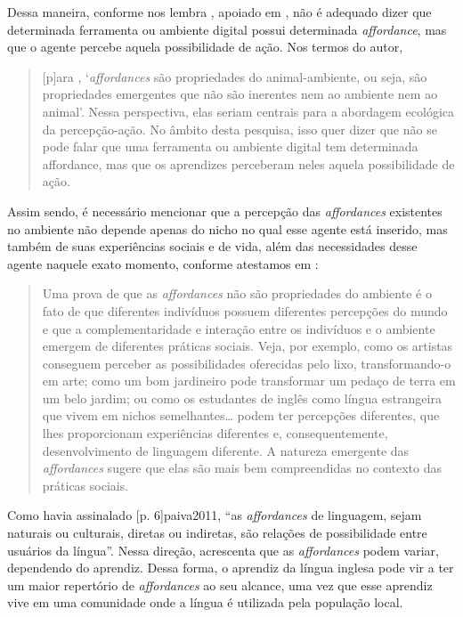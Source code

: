 \documentclass[portuguese]{textolivre}
\begin{document}
Dessa maneira, conforme nos lembra \textcite[p. 62]{gomes_junior_affordances_2018}, apoiado em \textcite{stoffregen_affordances_2003}, não é adequado dizer que determinada ferramenta ou ambiente digital possui determinada \emph{affordance}, mas  que o agente percebe aquela possibilidade de ação. Nos termos do autor, 

\begin{quote}
    [p]ara \textcite[p. 115]{stoffregen_affordances_2003}, ‘\emph{affordances} são propriedades do animal-ambiente, ou seja, são propriedades emergentes que não são inerentes nem ao ambiente nem ao animal’. Nessa perspectiva, elas seriam centrais para a abordagem ecológica da percepção-ação. No âmbito desta pesquisa, isso quer dizer que não se pode falar que uma ferramenta ou ambiente digital tem determinada affordance, mas que os aprendizes perceberam neles aquela possibilidade de ação. 
\end{quote}

Assim sendo, é necessário mencionar que a percepção das \emph{affordances} existentes no ambiente não depende apenas do nicho no qual esse agente está inserido, mas também de suas experiências sociais e de vida, além das necessidades desse agente naquele exato momento, conforme atestamos em \textcite[p. 3]{paiva2011}:

\begin{quote}
    Uma prova de que as \emph{affordances} não são propriedades do ambiente é o fato de que diferentes indivíduos possuem diferentes percepções do mundo e que a complementaridade e interação entre os indivíduos e o ambiente emergem de diferentes práticas sociais. Veja, por exemplo, como os artistas conseguem perceber as possibilidades oferecidas pelo lixo, transformando-o em arte; como um bom jardineiro pode transformar um pedaço de terra em um belo jardim; ou como os estudantes de inglês como língua estrangeira que vivem em nichos semelhantes… podem ter percepções diferentes, que lhes proporcionam experiências diferentes e, consequentemente, desenvolvimento de linguagem diferente. A natureza emergente das \emph{affordances} sugere que elas são mais bem compreendidas no contexto das práticas sociais. 
\end{quote}

Como havia assinalado
[p. 6]{paiva2011},
“as \emph{affordances} de linguagem, sejam naturais ou culturais, diretas ou indiretas, são relações de possibilidade entre usuários da língua”. Nessa direção, \textcite{paiva2011} acrescenta que as \emph{affordances} podem variar, dependendo do aprendiz. Dessa forma, o aprendiz da língua inglesa pode vir a ter um maior repertório de \emph{affordances} ao seu alcance, uma vez que esse aprendiz vive em uma comunidade onde a língua é utilizada pela população local. 
\end{document}
